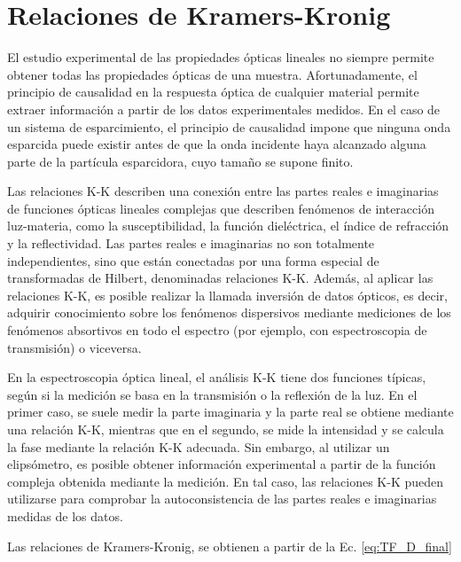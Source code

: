 

\section{Relaciones de Kramers-Kronig}
\label{section:yth}

El estudio experimental de las propiedades ópticas lineales no siempre permite obtener todas las propiedades ópticas de una muestra. Afortunadamente, el principio de causalidad en la respuesta óptica de cualquier material permite extraer información a partir de los datos experimentales medidos. En el caso de un sistema de esparcimiento, el principio de causalidad impone que ninguna onda esparcida puede existir antes de que la onda incidente haya alcanzado alguna parte de la partícula esparcidora, cuyo tamaño se supone finito.

Las relaciones K-K describen una conexión entre las partes reales e imaginarias de funciones ópticas lineales complejas que describen fenómenos de interacción luz-materia, como la susceptibilidad, la función dieléctrica, el índice de refracción y la reflectividad. Las partes reales e imaginarias no son totalmente independientes, sino que están conectadas por una forma especial de transformadas de Hilbert, denominadas relaciones K-K.  Además, al aplicar las relaciones K-K, es posible realizar la llamada inversión de datos ópticos, es decir, adquirir conocimiento sobre los fenómenos dispersivos mediante mediciones de los fenómenos absortivos en todo el espectro (por ejemplo, con espectroscopia de transmisión) o viceversa. 

En la espectroscopia óptica lineal, el análisis K-K tiene dos funciones típicas, según si la medición se basa en la transmisión o la reflexión de la luz. En el primer caso, se suele medir la parte imaginaria y la parte real se obtiene mediante una relación K-K, mientras que en el segundo, se mide la intensidad y se calcula la fase mediante la relación K-K adecuada.
Sin embargo, al utilizar un elipsómetro, es posible obtener información experimental a partir de la función compleja obtenida mediante la medición. En tal caso, las relaciones K-K pueden utilizarse para comprobar la autoconsistencia de las partes reales e imaginarias medidas de los datos.

Las relaciones de Kramers-Kronig, se obtienen a partir de la Ec. \eqref{eq:TF_D_final} 




